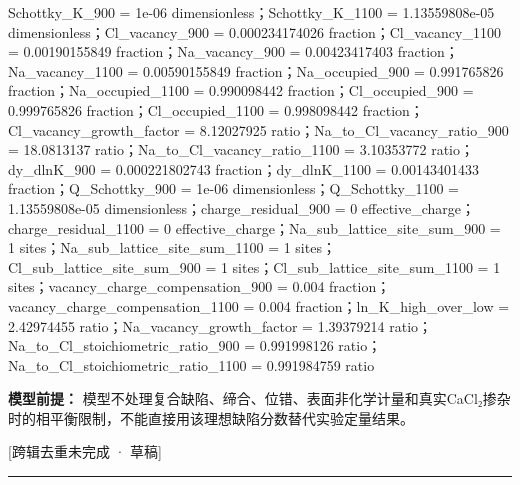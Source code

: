 \documentclass[UTF8,11pt,a4paper]{ctexart}
\begin{document}
Schottky\_K\_900 = 1e-06 dimensionless；Schottky\_K\_1100 = 1.13559808e-05 dimensionless；Cl\_vacancy\_900 = 0.000234174026 fraction；Cl\_vacancy\_1100 = 0.00190155849 fraction；Na\_vacancy\_900 = 0.00423417403 fraction；Na\_vacancy\_1100 = 0.00590155849 fraction；Na\_occupied\_900 = 0.991765826 fraction；Na\_occupied\_1100 = 0.990098442 fraction；Cl\_occupied\_900 = 0.999765826 fraction；Cl\_occupied\_1100 = 0.998098442 fraction；Cl\_vacancy\_growth\_factor = 8.12027925 ratio；Na\_to\_Cl\_vacancy\_ratio\_900 = 18.0813137 ratio；Na\_to\_Cl\_vacancy\_ratio\_1100 = 3.10353772 ratio；dy\_dlnK\_900 = 0.000221802743 fraction；dy\_dlnK\_1100 = 0.00143401433 fraction；Q\_Schottky\_900 = 1e-06 dimensionless；Q\_Schottky\_1100 = 1.13559808e-05 dimensionless；charge\_residual\_900 = 0 effective\_charge；charge\_residual\_1100 = 0 effective\_charge；Na\_sub\_lattice\_site\_sum\_900 = 1 sites；Na\_sub\_lattice\_site\_sum\_1100 = 1 sites；Cl\_sub\_lattice\_site\_sum\_900 = 1 sites；Cl\_sub\_lattice\_site\_sum\_1100 = 1 sites；vacancy\_charge\_compensation\_900 = 0.004 fraction；vacancy\_charge\_compensation\_1100 = 0.004 fraction；ln\_K\_high\_over\_low = 2.42974455 ratio；Na\_vacancy\_growth\_factor = 1.39379214 ratio；Na\_to\_Cl\_stoichiometric\_ratio\_900 = 0.991998126 ratio；Na\_to\_Cl\_stoichiometric\_ratio\_1100 = 0.991984759 ratio\par
\noindent\textbf{模型前提：}
模型不处理复合缺陷、缔合、位错、表面非化学计量和真实CaCl₂掺杂时的相平衡限制，不能直接用该理想缺陷分数替代实验定量结果。\par
\noindent\textcolor{red!65!black}{[跨辑去重未完成 · 草稿]} \par
\medskip\hrule\medskip
{}
\end{document}

